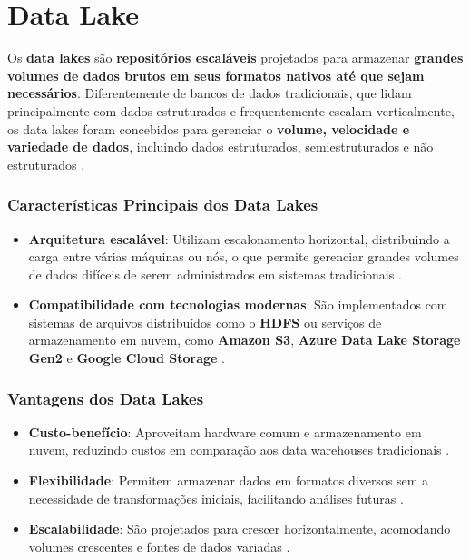 \section{Data Lake}

Os \textbf{data lakes} são \textbf{repositórios escaláveis} projetados para armazenar \textbf{grandes volumes de dados brutos em seus formatos nativos até que sejam necessários}. Diferentemente de bancos de dados tradicionais, que lidam principalmente com dados estruturados e frequentemente escalam verticalmente, os data lakes foram concebidos para gerenciar o \textbf{volume, velocidade e variedade de dados}, incluindo dados estruturados, semiestruturados e não estruturados \cite{fang_data_lakes_2021}.

\subsubsection*{Características Principais dos Data Lakes}
\begin{itemize}
    \item \textbf{Arquitetura escalável}: Utilizam escalonamento horizontal, distribuindo a carga entre várias máquinas ou nós, o que permite gerenciar grandes volumes de dados difíceis de serem administrados em sistemas tradicionais \cite{gonzalez_scalable_systems_2019}.
    \item \textbf{Compatibilidade com tecnologias modernas}: São implementados com sistemas de arquivos distribuídos como o \textbf{HDFS} ou serviços de armazenamento em nuvem, como \textbf{Amazon S3}, \textbf{Azure Data Lake Storage Gen2} e \textbf{Google Cloud Storage} \cite{vass_bigdata_cloud_2020}.
\end{itemize}

\subsubsection*{Vantagens dos Data Lakes}
\begin{itemize}
    \item \textbf{Custo-benefício}: Aproveitam hardware comum e armazenamento em nuvem, reduzindo custos em comparação aos data warehouses tradicionais \cite{datar_lake_approaches_2020}.
    \item \textbf{Flexibilidade}: Permitem armazenar dados em formatos diversos sem a necessidade de transformações iniciais, facilitando análises futuras \cite{datar_lake_approaches_2020}.
    \item \textbf{Escalabilidade}: São projetados para crescer horizontalmente, acomodando volumes crescentes e fontes de dados variadas \cite{datar_lake_approaches_2020}.
\end{itemize}

